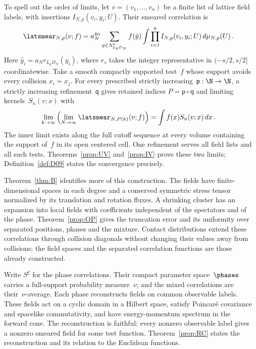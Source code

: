 To spell out the order of limits, let $v=(v_1,\ldots,v_n)$ be a finite list of lattice field labels, with insertions $I_{N,p}(v_i,y_i;U)$. Their smeared correlation is
\begin{equation*}
\latsmear_{N,p}(v;f)=a_N^{4n}\sum_{y\in\Lambda_{L_pD_N}^n}f(\hat y)
\int\prod_{i=1}^n I_{N,p}(v_i,y_i;U)\,d\mu_{N,p}(U)\,.
\end{equation*}
Here $\hat y_i=a_Nr_{L_pD_N}(y_i)$, where $r_s$ takes the integer representative in $(-s/2,s/2]$ coordinatewise. Take a smooth compactly supported test~$f$ whose support avoids every collision $x_i=x_j$. For every prescribed strictly increasing~$\mathsf p:\N\to\N$, a strictly increasing refinement~$\mathsf q$ gives retained indices $P=\mathsf p\circ\mathsf q$ and limiting kernels~$S_n(v;x)$ with
\begin{equation}\label{eq:intro-ordered-limit}
\lim_{k\to\infty}\left(\lim_{N\to\infty}\latsmear_{N,P(k)}(v;f)\right)
=\int f(x)S_n(v;x)\,dx\,.
\end{equation}
The inner limit exists along the full cutoff sequence at every volume containing the support of~$f$ in its open centered cell. One refinement serves all field lists and all such tests. Theorems~\ref{prop:UV} and~\ref{prop:IV} prove these two limits; Definition~\ref{def:D09} states the convergence precisely.

Theorem~\ref{thm:B} identifies more of this construction. The fields have finite-dimensional spaces in each degree and a conserved symmetric stress tensor normalized by its translation and rotation fluxes. A shrinking cluster has an expansion into local fields with coefficients independent of the spectators and of the phase. Theorem~\ref{prop:OP} gives the truncation error and its uniformity over separated positions, phases and the mixture. Contact distributions extend these correlations through collision diagonals without changing their values away from collisions; the field spaces and the separated correlation functions are those already constructed.

Write $S^\xi$ for the phase correlations. Their compact parameter space~$\phases$ carries a full-support probability measure~$\nu$, and the mixed correlations are their~$\nu$-average. Each phase reconstructs fields on common observable labels. These fields act on a cyclic domain in a Hilbert space, satisfy Poincar\'e covariance and spacelike commutativity, and have energy-momentum spectrum in the forward cone. The reconstruction is faithful: every nonzero observable label gives a nonzero smeared field for some test function. Theorem~\ref{prop:RC} states the reconstruction and its relation to the Euclidean functions.

